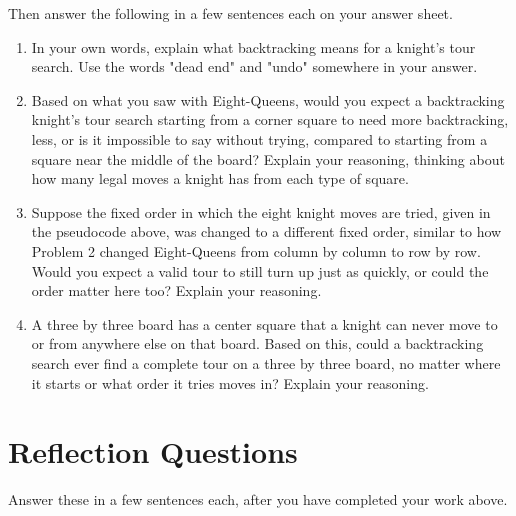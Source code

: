 \documentclass[11pt]{article}
\begin{document}
Then answer the following in a few sentences each on your answer sheet.

\begin{enumerate}[leftmargin=1.4em]
  \item In your own words, explain what backtracking means for a knight's
        tour search. Use the words "dead end" and "undo" somewhere in your
        answer.
  \item Based on what you saw with Eight-Queens, would you expect a
        backtracking knight's tour search starting from a corner square to
        need more backtracking, less, or is it impossible to say without
        trying, compared to starting from a square near the middle of the
        board? Explain your reasoning, thinking about how many legal moves
        a knight has from each type of square.
  \item Suppose the fixed order in which the eight knight moves are tried,
        given in the pseudocode above, was changed to a different fixed
        order, similar to how Problem 2 changed Eight-Queens from column by
        column to row by row. Would you expect a valid tour to still turn
        up just as quickly, or could the order matter here too? Explain
        your reasoning.
  \item A three by three board has a center square that a knight can never
        move to or from anywhere else on that board. Based on this, could a
        backtracking search ever find a complete tour on a three by three
        board, no matter where it starts or what order it tries moves in?
        Explain your reasoning.
\end{enumerate}

\section{Reflection Questions}
Answer these in a few sentences each, after you have completed your work
above.
\end{document}
